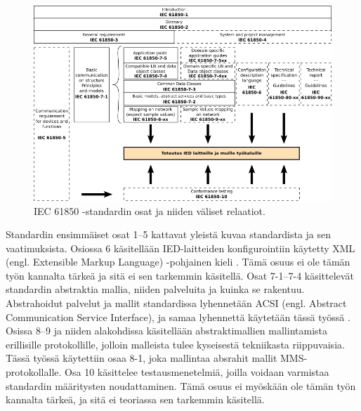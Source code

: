 \begin{figure}[ht!]
	\includegraphics[width=1\textwidth]{pictures/iec61850-series-parts-and-relations.png}
	\caption{IEC 61850 -standardin osat ja niiden väliset relaatiot.}
	\label{fig:iec61850-osat-ja-relaatiot}
\end{figure}

Standardin ensimmäiset osat 1--5 kattavat yleistä kuvaa standardista ja sen vaatimuksista. Osiossa 6 käsitellään IED-laitteiden konfigurointiin käytetty XML (engl. Extensible Markup Language) -pohjainen kieli \cite[s.~7--8]{IEC61850-6}. Tämä osuus ei ole tämän työn kannalta tärkeä ja sitä ei sen tarkemmin käsitellä. Osat 7-1--7-4 käsittelevät standardin abstraktia mallia, niiden palveluita ja kuinka se rakentuu. Abstrahoidut palvelut ja mallit standardissa lyhennetään ACSI (engl. Abstract Communication Service Interface), ja samaa lyhennettä käytetään tässä työssä \cite[s.~72]{IEC61850-7-1}. Osissa 8--9 ja niiden alakohdissa käsitellään abstraktimallien mallintamista erillisille protokollille, jolloin malleista tulee kyseisestä tekniikasta riippuvaisia. Tässä työssä käytettiin osaa 8-1, joka mallintaa absrahit mallit MMS-protokollalle. Osa 10 käsittelee testausmenetelmiä, joilla voidaan varmistaa standardin määritysten noudattaminen. Tämä osuus ei myöskään ole tämän työn kannalta tärkeä, ja sitä ei teoriassa sen tarkemmin käsitellä. \cite[s.~15]{IEC61850-7-1}


